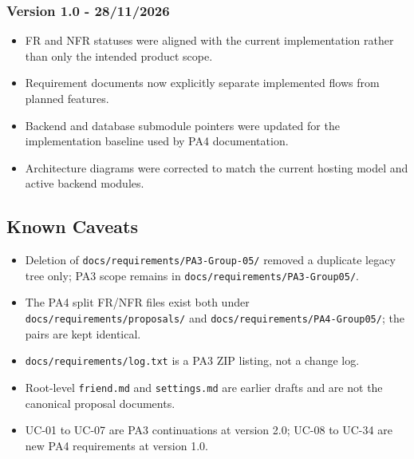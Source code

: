 \documentclass[12pt]{article}
\begin{document}
\hypertarget{sec:version-1-0-28-11-2026}{}
\subsubsection*{Version 1.0 - 28/11/2026}
\par\medskip

\begin{itemize}
\item FR and NFR statuses were aligned with the current implementation rather than only the intended product scope.
\item Requirement documents now explicitly separate implemented flows from planned features.
\item Backend and database submodule pointers were updated for the implementation baseline used by PA4 documentation.
\item Architecture diagrams were corrected to match the current hosting model and active backend modules.
\end{itemize}
\par\medskip

\hypertarget{sec:known-caveats}{}
\subsection*{Known Caveats}
\par\medskip

\begin{itemize}
\item Deletion of \texttt{docs/requirements/PA3-Group-05/} removed a duplicate legacy tree only; PA3 scope remains in \texttt{docs/requirements/PA3-Group05/}.
\item The PA4 split FR/NFR files exist both under \texttt{docs/requirements/proposals/} and \texttt{docs/requirements/PA4-Group05/}; the pairs are kept identical.
\item \texttt{docs/requirements/log.txt} is a PA3 ZIP listing, not a change log.
\item Root-level \texttt{friend.md} and \texttt{settings.md} are earlier drafts and are not the canonical proposal documents.
\item UC-01 to UC-07 are PA3 continuations at version 2.0; UC-08 to UC-34 are new PA4 requirements at version 1.0.
\end{itemize}
\par\medskip
\end{document}
